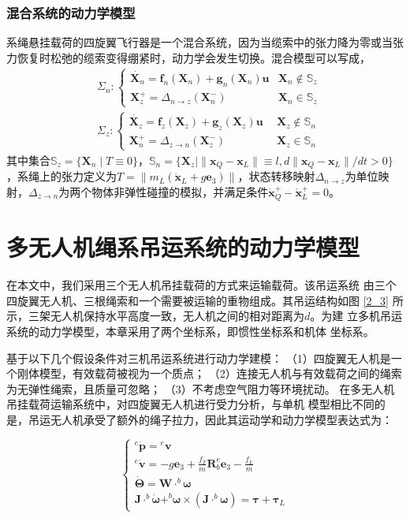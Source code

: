 \documentclass[lang=chs, degree=master, blindreview=false, winfonts=true]{yanputhesis}
\begin{document}
\subsubsection{混合系统的动力学模型}
系绳悬挂载荷的四旋翼飞行器是一个混合系统，因为当缆索中的张力降为零或当张力恢复时松弛的缆索变得绷紧时，动力学会发生切换。混合模型可以写成，
\begin{equation}
	\left.\begin{aligned}&\Sigma_{n}:\left\{\begin{array}{ll}\dot{\bm X_n}=\bm f_n(\bm X_n)+\bm g_n(\bm X_n)\bm u  &\bm X_n\notin \mathbb{S}_z\\\bm X_z^+=\Delta_{n\to z}(\bm X_n^-)  &\bm X_n\in \mathbb{S}_z\end{array}\right.\\&\Sigma_{z}:\left\{\begin{array}{ll}\dot{\bm X_z}=\bm f_z(\bm X_z)+\bm g_z(\bm X_z)\bm u \ \ &\bm X_z\notin \mathbb{S}_n\\\bm X_n^+=\Delta_{z\to n}(\bm X_z^-) \ &\bm X_z\in \mathbb{S}_n\end{array}\right.\end{aligned}\right.
\end{equation}
其中集合$\mathbb S_z = \{ \bm X_n \mid  T \equiv 0 \}$，$\mathbb S_n = \{ \bm X_z \mid \|\bm x_Q - \bm x_L\| \equiv l, d \|\bm x_Q - \bm x_L\| /dt> 0 \}$，系绳上的张力定义为$T = \|m_L (\ddot{\bm x}_L + g\mathbf{e}_3)\|$，状态转移映射$\Delta_{n\to z}$为单位映射，$\Delta_{z\to n}$为两个物体非弹性碰撞的模拟，并满足条件$\dot{\bm x}_Q^+-\dot{\bm x}_L^+=0$。

\section{多无人机绳系吊运系统的动力学模型}
在本文中，我们采用三个无人机吊挂载荷的方式来运输载荷。该吊运系统
由三个四旋翼无人机、三根绳索和一个需要被运输的重物组成。其吊运结构如图 \ref{2_3} 所示，三架无人机保持水平高度一致，无人机之间的相对距离为$d$。为建
立多机吊运系统的动力学模型，本章采用了两个坐标系，即惯性坐标系和机体
坐标系。


基于以下几个假设条件对三机吊运系统进行动力学建模：
（1）四旋翼无人机是一个刚体模型，有效载荷被视为一个质点；
（2）连接无人机与有效载荷之间的绳索为无弹性绳索，且质量可忽略；
（3）不考虑空气阻力等环境扰动。
在多无人机吊挂载荷运输系统中，对四旋翼无人机进行受力分析，与单机
模型相比不同的是，吊运无人机承受了额外的绳子拉力，因此其运动学和动力学模型表达式为：

\begin{equation}
	\begin{cases}{}^{e}\dot{\boldsymbol{p}}={}^{e}\boldsymbol{v}\\{}^{e}\dot{\boldsymbol{v}}=-g\boldsymbol{e}_{3}+\frac{f_{T}}{m}\boldsymbol{R}_{b}^{e}\boldsymbol{e}_{3}-\frac{f_{L}}{m}\\\dot{\boldsymbol{\Theta}}=\boldsymbol{W}\cdot^{b}\boldsymbol{\omega}\\\boldsymbol{J}\cdot^{b}\dot{\boldsymbol{\omega}}+^{b}\boldsymbol{\omega}\times(\boldsymbol{J}\cdot^{b}\boldsymbol{\omega})=\boldsymbol{\tau}+\boldsymbol{\tau}_{L}\end{cases}
\end{equation}
\end{document}
